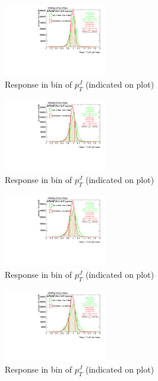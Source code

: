 \begin{figure}

\includegraphics[width=0.4\textwidth]{appendixB/mTASCOMB_W_calibmCal_030ro_20:38:43-03-11-2016/8ResponsePTJ_h_JetRatio_mJ04CALO.pdf}
\caption{Response in bin of  $p_{T}^{J}$ (indicated on plot)} 

\end{figure}

\begin{figure}

\includegraphics[width=0.4\textwidth]{appendixB/mTASCOMB_W_calibmCal_030ro_20:38:43-03-11-2016/8ResponsePTJ_h_JetRatio_mJ05CALO.pdf}
\caption{Response in bin of  $p_{T}^{J}$ (indicated on plot)} 

\end{figure}

\begin{figure}

\includegraphics[width=0.4\textwidth]{appendixB/mTASCOMB_W_calibmCal_030ro_20:38:43-03-11-2016/8ResponsePTJ_h_JetRatio_mJ06CALO.pdf}
\caption{Response in bin of  $p_{T}^{J}$ (indicated on plot)} 

\end{figure}

%
\begin{figure}

\includegraphics[width=0.4\textwidth]{appendixB/mTASCOMB_W_calibmCal_030ro_20:38:43-03-11-2016/8ResponsePTJ_h_JetRatio_mJ07CALO.pdf}
\caption{Response in bin of  $p_{T}^{J}$ (indicated on plot)} 

\end{figure}


